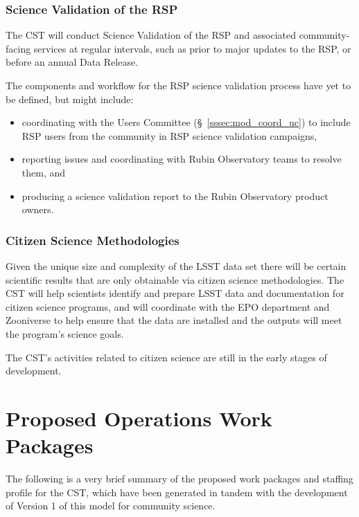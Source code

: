 \documentclass[DM,authoryear,toc]{lsstdoc}
\begin{document}
\subsubsection{Science Validation of the RSP}\label{sssec:mod_dev_sv}

The CST will conduct Science Validation of the RSP and associated community-facing services at regular intervals, such as prior to major updates to the RSP, or before an annual Data Release.

The components and workflow for the RSP science validation process have yet to be defined, but might include:
\begin{itemize}
\item coordinating with the Users Committee (\S~\ref{sssec:mod_coord_uc}) to include RSP users from the community in RSP science validation campaigns,
\item reporting issues and coordinating with Rubin Observatory teams to resolve them, and
\item producing a science validation report to the Rubin Observatory product owners.
\end{itemize}


\subsubsection{Citizen Science Methodologies}\label{sssec:mod_dev_citizen}

Given the unique size and complexity of the LSST data set there will be certain scientific results that are only obtainable via citizen science methodologies.
The CST will help scientists identify and prepare LSST data and documentation for citizen science programs, and will coordinate with the EPO department and Zooniverse to help ensure that the data are installed and the outputs will meet the program's science goals.

The CST's activities related to citizen science are still in the early stages of development.






\section{Proposed Operations Work Packages}\label{sec:comp}

The following is a very brief summary of the proposed work packages and staffing profile for the CST, which have been generated in tandem with the development of Version 1 of this model for community science.
\end{document}
